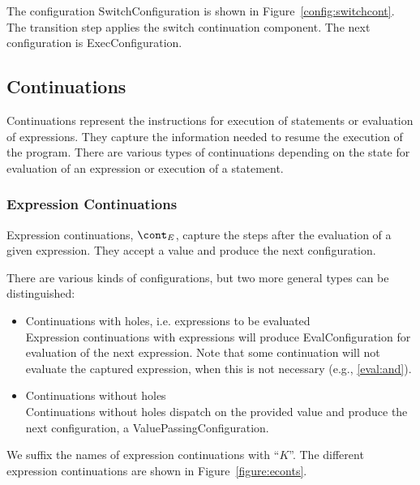 \documentclass[a4paper,oneside,fleqn]{article}
\begin{document}
The configuration SwitchConfiguration is shown in Figure~\ref{config:switchcont}.
The transition step applies the switch continuation component.
The next configuration is ExecConfiguration.


\subsection{Continuations}
\label{subsec:continuations-definition}

Continuations represent the instructions for execution of statements or evaluation of expressions.
They capture the information needed to resume the execution of the program.
There are various types of continuations depending on the state for evaluation of an expression or execution of a statement.


\subsubsection{Expression Continuations}
\label{subsubsec:expression-continuations}

Expression continuations, $\econt$, capture the steps after the evaluation of a given expression.
They accept a value and produce the next configuration.

There are various kinds of configurations, but two more general types can be distinguished:

\begin{itemize}
    \item Continuations with holes, i.e. expressions to be evaluated\\
        Expression continuations with expressions will produce EvalConfiguration for evaluation of the next expression.
        Note that some continuation will not evaluate the captured expression, when this is not necessary (e.g., \eqref{eval:and}).

    \item Continuations without holes\\
        Continuations without holes dispatch on the provided value and produce the next configuration, a ValuePassingConfiguration.

\end{itemize}

We suffix the names of expression continuations with ``$K$''.
The different expression continuations are shown in Figure~\ref{figure:econts}.

\newcommand{\ExceptionHandlersRest}{\handler,\,\cstrace,\,\cex}
\newcommand{\ExceptionHandlers}{\strace,\,\handler,\,\cstrace,\,\cex}
\newcommand{\VarSetK}[4]{\mathrm{VarSetEK}({#1},\,{#2},\,{#3},\,{#4})}
\newcommand{\ExpressionsK}[3]{\mathrm{ExpressionsEK}({#1},\,{#2},\,\ExceptionHandlers,\,{#3})}
\end{document}
